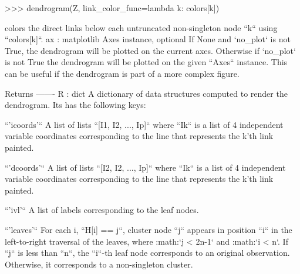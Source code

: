 \begin{DoxyVerb}
    >>> dendrogram(Z, link_color_func=lambda k: colors[k])

    colors the direct links below each untruncated non-singleton node
    ``k`` using ``colors[k]``.
ax : matplotlib Axes instance, optional
    If None and `no_plot` is not True, the dendrogram will be plotted
    on the current axes.  Otherwise if `no_plot` is not True the
    dendrogram will be plotted on the given ``Axes`` instance. This can be
    useful if the dendrogram is part of a more complex figure.

Returns
-------
R : dict
    A dictionary of data structures computed to render the
    dendrogram. Its has the following keys:

    ``'icoords'``
      A list of lists ``[I1, I2, ..., Ip]`` where ``Ik`` is a list of 4
      independent variable coordinates corresponding to the line that
      represents the k'th link painted.

    ``'dcoords'``
      A list of lists ``[I2, I2, ..., Ip]`` where ``Ik`` is a list of 4
      independent variable coordinates corresponding to the line that
      represents the k'th link painted.

    ``'ivl'``
      A list of labels corresponding to the leaf nodes.

    ``'leaves'``
      For each i, ``H[i] == j``, cluster node ``j`` appears in position
      ``i`` in the left-to-right traversal of the leaves, where
      :math:`j < 2n-1` and :math:`i < n`. If ``j`` is less than ``n``, the
      ``i``-th leaf node corresponds to an original observation.
      Otherwise, it corresponds to a non-singleton cluster.\end{DoxyVerb}
 \hypertarget{namespacescipy_1_1cluster_1_1hierarchy_adab69119d3ded3eea468daaa4fa49d66}{}
